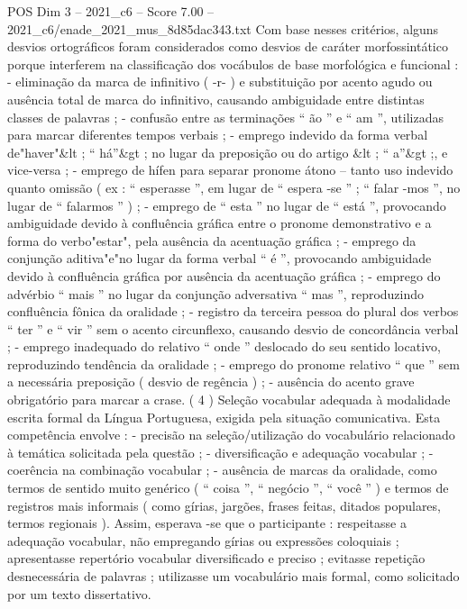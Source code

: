 \begin{textsample}{POS Dim 3 – 2021\_c6 – Score 7.00 – 2021\_c6/enade\_2021\_mus\_8d85dac343.txt}
Com base nesses critérios, alguns desvios ortográficos foram considerados como desvios de caráter morfossintático porque interferem na classificação dos vocábulos de base morfológica e funcional : - eliminação da marca de infinitivo ( -r- ) e substituição por acento agudo ou ausência total de marca do infinitivo, causando ambiguidade entre distintas classes de palavras ; - confusão entre as terminações “ ão ” e “ am ”, utilizadas para marcar diferentes tempos verbais ; - emprego indevido da forma verbal de"haver"\&lt ; “ há”\&gt ; no lugar da preposição ou do artigo \&lt ; “ a”\&gt ;, e vice-versa ; - emprego de hífen para separar pronome átono – tanto uso indevido quanto omissão ( ex : “ esperasse ”, em lugar de “ espera -se ” ; “ falar -mos ”, no lugar de “ falarmos ” ) ; - emprego de “ esta ” no lugar de “ está ”, provocando ambiguidade devido à confluência gráfica entre o pronome demonstrativo e a forma do verbo"estar", pela ausência da acentuação gráfica ; - emprego da conjunção aditiva"e"no lugar da forma verbal “ é ”, provocando ambiguidade devido à confluência gráfica por ausência da acentuação gráfica ; - emprego do advérbio “ mais ” no lugar da conjunção adversativa “ mas ”, reproduzindo confluência fônica da oralidade ; - registro da terceira pessoa do plural dos verbos “ ter ” e “ vir ” sem o acento circunflexo, causando desvio de concordância verbal ; - emprego inadequado do relativo “ onde ” deslocado do seu sentido locativo, reproduzindo tendência da oralidade ; - emprego do pronome relativo “ que ” sem a necessária preposição ( desvio de regência ) ; - ausência do acento grave obrigatório para marcar a crase. ( 4 ) Seleção vocabular adequada à modalidade escrita formal da Língua Portuguesa, exigida pela situação comunicativa.
Esta competência envolve : - precisão na seleção/utilização do vocabulário relacionado à temática solicitada pela questão ; - diversificação e adequação vocabular ; - coerência na combinação vocabular ; - ausência de marcas da oralidade, como termos de sentido muito genérico ( “ coisa ”, “ negócio ”, “ você ” ) e termos de registros mais informais ( como gírias, jargões, frases feitas, ditados populares, termos regionais ).
Assim, esperava -se que o participante : respeitasse a adequação vocabular, não empregando gírias ou expressões coloquiais ; apresentasse repertório vocabular diversificado e preciso ; evitasse repetição desnecessária de palavras ; utilizasse um vocabulário mais formal, como solicitado por um texto dissertativo.

\end{textsample}
